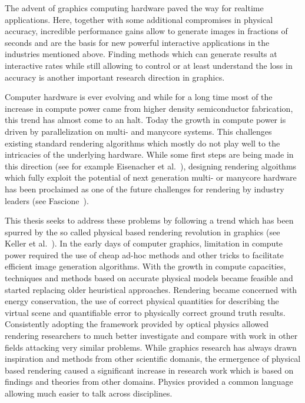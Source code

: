 The advent of graphics computing hardware paved the way for realtime applications. Here, together with some additional compromises in physical accuracy, incredible performance gains allow to generate images in fractions of seconds and are the basis for new powerful interactive applications in the industries mentioned above. Finding methods which can generate results at interactive rates while still allowing to control or at least understand the loss in accuracy is another important research direction in graphics.

Computer hardware is ever evolving and while for a long time most of the increase in compute power came from higher density semiconductor fabrication, this trend has almost come to an halt. Today the growth in compute power is driven by parallelization on multi- and manycore systems. This challenges existing standard rendering algorithms which mostly do not play well to the intricacies of the underlying hardware. While some first steps are being made in this direction (see for example Eisenacher et al.~\cite{Eisenacher13}), designing rendering algoithms which fully exploit the potential of next generation multi- or manycore hardware has been proclaimed as one of the future challenges for rendering by industry leaders (see Fascione~\cite{Fascione15}).

This thesis seeks to address these problems by following a trend which has been spurred by the so called physical based rendering revolution in graphics (see Keller et al.~\cite{Keller15}). In the early days of computer graphics, limitation in compute power required the use of cheap ad-hoc methods and other tricks to facilitate efficient image generation algorithms. With the growth in compute capacities, techniques and methods based on accurate physical models became feasible and started replacing older heuristical approaches. Rendering became concerned with energy conservation, the use of correct physical quantities for describing the virtual scene and quantifiable error to physically correct ground truth results. Consistently adopting the framework provided by optical physics allowed rendering researchers to much better investigate and compare with work in other fields attacking very similar problems. While graphics research has always drawn inspiration and methods from other scientific domanis, the ermergence of physical based rendering caused a significant increase in research work which is based on findings and theories from other domains. Physics provided a common language allowing much easier to talk across disciplines.

